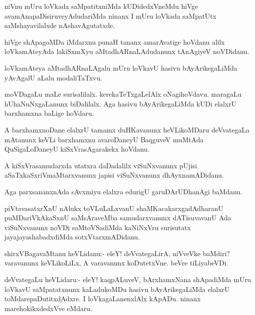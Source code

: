 \begin{mng}
niVnu mUru loVkada saMpatitxniMda kUDidedxVneMdu hiVge avamAnapaDisiruveyAdudariMda ninanx I mUru loVkada saMpatUtx saMshayavilalxde nAshavAgutatxde. 
\end{mng}

\begin{mng}
hiVge shApagoMDa iMdarxnu punaH tananx amarAvatige hoVdanu alilx loVkamAteyAda lakiSxmXyu aMtadhARnaLAdudanunx tAnAgiyeV noVDidanu.
\end{mng}

\begin{mng}
loVkamAteya aMtadhARnaLAgalu mUru loVkavU hasivu bAyArikegaLiMda yAvAgalU aLalu modaliTaTxvu.
\end{mng}

\begin{mng}
moVDagaLu maLe surisalilalx. kerekaTeTxgaLelAlx oNagihoVdavu. maragaLu hUhaNuNxgaLanunx biDalilalx. Aga hasivu bAyArikegaLiMda kUDi elalxrU barxhamxna baLige hoVdaru.
\end{mng}

\begin{mng}
A barxhamxnoDane elalxrU tamamx duHKavanunx heVLikoMDaru deVvategaLa mAtanunx keVLi barxhamxnu avaroDaneyU BaqguveV muMtAda QuSigaLoDaneyU kiSxVrasAgarakekx hoVdanu.
\end{mng}

\begin{mng}
A kiSxVrasamudarxda utatxra daDadalilx viSuNxvanunx pUjisi aSaTxkaSxriVmaMtarxvanunx japisi viSuNxvanunx dhAyxnamADidanu.
\end{mng}

\begin{mng}
Aga parxsananxnAda sAvxmiyu elalxra edurigU garuDArUDhanAgi baMdanu.
\end{mng}

\begin{mng}
piVtavasatxrXnU nAlukx toVLuLaLxvanU shaMKacakarxgadAdharanU puMDariVkAkaSxnU saMsAraveMba samudarxvanunx dATisuvavanU Ada viSuNxvanunx noVDi saMtoVSadiMda kaNiNxVru surisutatx jayajayashabadxdiMda sotxVtarxmADidanu.
\end{mng}

\begin{mng}
shirxVBagavaMtanu heVLidanu:- eleY! deVvategaLirA, niVveVke baMdiri? varavanunx keVLikoLiLx, A varavanunx koDutetxVne. beVre tiLiyabeVDi.
\end{mng}

\begin{mng}
deVvategaLu heVLidaru:- eleY! kaqpALuveV, bArxhamxNana shApadiMda mUru loVkavU saMpatatxnunx kaLadukoMDu hasivu bAyArikegaLiMda elalxrU toMdarepaDutitxdAdxre. I loVkagaLanenxlAlx kApADu. ninanx marehokikxdedxVve eMdaru.
\end{mng}

